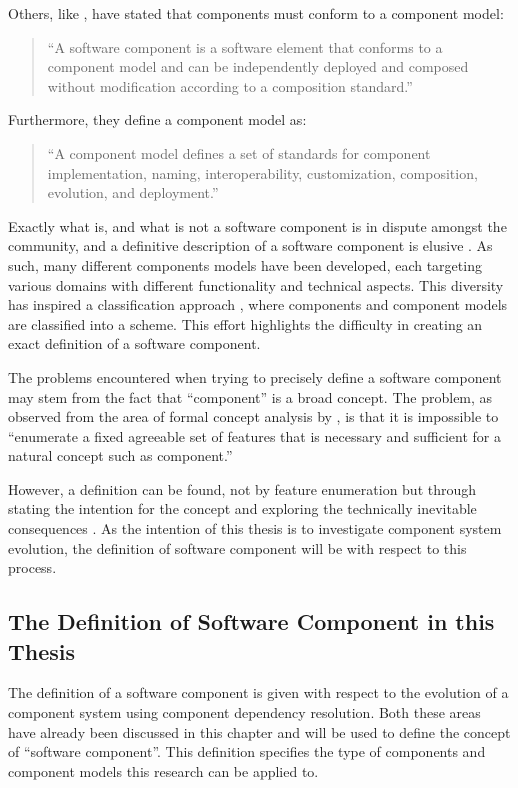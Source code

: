 Others, like \citep{heineman2001component}, have stated that components must conform to a component model: 
\begin{quotation}
``A software component is a software element that conforms to a component model and can be independently deployed and composed without modification according to a composition standard.''
\end{quotation}

Furthermore, they define a component model as:
\begin{quotation}
``A component model defines a set of standards for component implementation, naming, interoperability, customization, composition, evolution, and deployment.''
\end{quotation}

Exactly what is, and what is not a software component is in dispute amongst the community,
and a definitive description of a software component is elusive \citep{vasa2007patterns}.
As such, many different components models have been developed, each targeting various domains with different functionality and technical aspects.
This diversity has inspired a classification approach \citep{Crnkovic2011}, where components and component models are classified into a scheme.
This effort highlights the difficulty in creating an exact definition of a software component. 

The problems encountered when trying to precisely define a software component may stem from the fact that ``component'' is a broad concept.
The problem, as observed from the area of formal concept analysis \citep{Ganter1999} by \citep{Szyperski2002}, is that it is impossible to
``enumerate a fixed agreeable set of features that is necessary and sufficient for a natural concept such as component.''

However, a definition can be found, not by feature enumeration but through stating the intention for the concept
and exploring the technically inevitable consequences \citep{Szyperski2002}. 
As the intention of this thesis is to investigate component system evolution,
the definition of software component will be with respect to this process.

\subsection{The Definition of Software Component in this Thesis}
The definition of a software component is given with respect to the evolution of a component system using component dependency resolution.
Both these areas have already been discussed in this chapter and will be used to define the concept of ``software component''.
This definition specifies the type of components and component models this research can be applied to.

